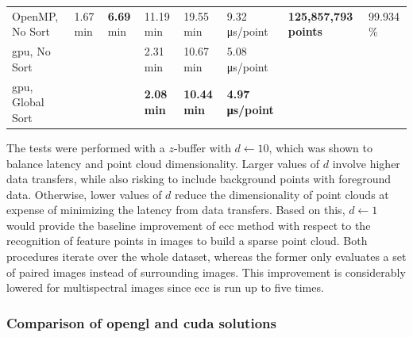 \begin{table}
\begin{tabular}{l@{\hskip 0.25in}|lll|l|l|l|l}
    \cmidrule{1-8}
    OpenMP, No Sort & \multirow{\numExperiments}{*}{1.67 \si{\minute}} & \multirow{\numExperiments}{*}{\textbf{6.69} \si{\minute}} & 11.19 \si{\minute} & 19.55 \si{\minute} & 9.32 \si{\micro\second}/point & \multirow{\numExperiments}{*}{\textbf{125,857,793 points}} & \multirow{\numExperiments}{*}{99.934 \%}\\
    \acrshort{gpu}, No Sort & & & 2.31 \si{\minute} & 10.67 \si{\minute} & 5.08 \si{\micro\second}/point & &\\
    \acrshort{gpu}, Global Sort & & & \textbf{2.08 \si{\minute}} & \textbf{10.44 \si{\minute}} & \textbf{4.97 \si{\micro\second}/point} & &\\
    \bottomrule
    \end{tabular}
\end{table}
\renewcommand{\arraystretch}{1}

The tests were performed with a $z$-buffer with $d \gets 10$, which was shown to balance latency and point cloud dimensionality. Larger values of $d$ involve higher data transfers, while also risking to include background points with foreground data. Otherwise, lower values of $d$ reduce the dimensionality of point clouds at expense of minimizing the latency from data transfers. Based on this, $d \gets 1$ would provide the baseline improvement of \acrshort{ecc} method with respect to the recognition of feature points in images to build a sparse point cloud. Both procedures iterate over the whole dataset, whereas the former only evaluates a set of paired images instead of surrounding images. This improvement is considerably lowered for multispectral images since \acrshort{ecc} is run up to five times. 

\subsubsection{Comparison of \acrshort{opengl} and \acrshort{cuda} solutions}

